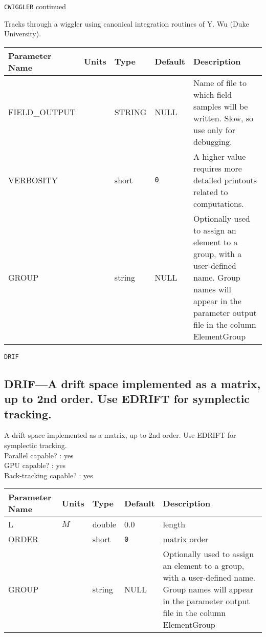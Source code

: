 \newpage
\begin{center}{\Large\verb|CWIGGLER| continued}\end{center}
Tracks through a wiggler using canonical integration routines of Y. Wu (Duke University).
\\
\begin{tabular}{|l|l|l|l|p{\descwidth}|} \hline
Parameter Name & Units & Type & Default & Description \\ \hline 
FIELD\_OUTPUT &  & STRING &   NULL            & Name of file to which field samples will be written.  Slow, so use only for debugging.  \\ \hline 
VERBOSITY &  & short &  \verb|0| & A higher value requires more detailed printouts related to computations.  \\ \hline 
GROUP &  & string & NULL & Optionally used to assign an element to a group, with a user-defined name.  Group names will appear in the parameter output file in the column ElementGroup  \\ \hline 
\end{tabular}

\vspace*{0.5in}

\newpage
\begin{center}{\Large\verb|DRIF|}\end{center}
\subsection{DRIF---A drift space implemented as a matrix, up to 2nd order. Use EDRIFT for symplectic tracking.}
A drift space implemented as a matrix, up to 2nd order. Use EDRIFT for symplectic tracking.
\\
Parallel capable? : yes\\
GPU capable? : yes\\
Back-tracking capable? : yes\\
\begin{tabular}{|l|l|l|l|p{\descwidth}|} \hline
Parameter Name & Units & Type & Default & Description \\ \hline 
L & $M$ & double &  0.0 & length  \\ \hline 
ORDER &  & short &  \verb|0| & matrix order  \\ \hline 
GROUP &  & string & NULL & Optionally used to assign an element to a group, with a user-defined name.  Group names will appear in the parameter output file in the column ElementGroup  \\ \hline 
\end{tabular}

